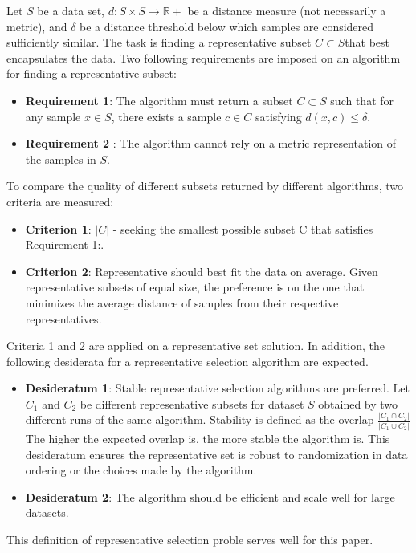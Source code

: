 \documentclass[thesis=B,english]{FITthesis}[2012/10/20]
\begin{document}
Let $S$ be a data set, $d : S \times S \to \mathbb{R} +$ be a distance measure (not necessarily a metric), and $\delta$ be a distance threshold below which samples are considered sufficiently similar.
The task is finding a representative subset $C \subset S$that best encapsulates the data.
Two following requirements are imposed on an algorithm for finding a representative subset:
\begin{itemize}
    \item \textbf{Requirement 1}: The algorithm must return a subset $C \subset S$ such that for any sample $x \in S$, there exists a sample $c \in C$ satisfying $d(x, c) \le \delta$.
    \item \textbf{Requirement 2} : The algorithm cannot rely on a metric representation of the samples in $S$.
\end{itemize}
To compare the quality of different subsets returned by different algorithms, two criteria are measured:
\begin{itemize}
    \item \textbf{Criterion 1}: $|C|$ - seeking the smallest possible subset C that satisfies Requirement 1:.
    \item \textbf{Criterion 2}: Representative should best fit the data on average. Given representative subsets of equal size, the preference is on the one that minimizes the average distance of samples from their respective representatives.
\end{itemize}
Criteria 1 and 2 are applied on a representative set solution.
In addition, the following desiderata for a representative selection algorithm are expected.
\begin{itemize}
    \item \textbf{Desideratum 1}: Stable representative selection algorithms are preferred. Let $C_1$ and $C_2$ be different representative subsets for dataset $S$ obtained by two different runs of the same algorithm.
Stability is defined as the overlap $\frac{|C_1 \cap C_2|}{|C_1 \cup C_2|}$
 The higher the expected overlap is, the more stable the
algorithm is. This desideratum ensures the representative set is robust to
randomization in data ordering or the choices made by the algorithm.
    \item \textbf{Desideratum 2}: The algorithm should be efficient and scale
well for large datasets.
\end{itemize}

This definition of representative selection proble serves well for this paper.
\end{document}
